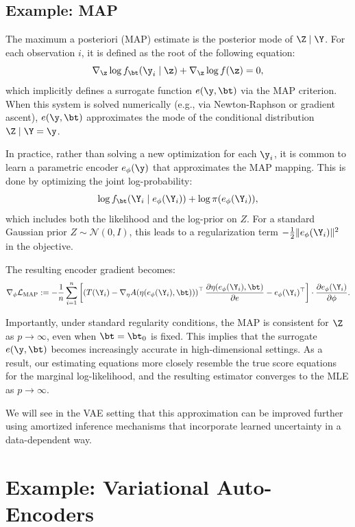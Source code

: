 \subsection{Example: MAP}

The maximum a posteriori (MAP) estimate is the posterior mode of \( \Z \mid \Y \). For each observation \( i \), it is defined as the root of the following equation:
\[
\nabla_{\z} \log f_\bt(\y_i \mid \z) + \nabla_{\z} \log f(\z) = 0,
\]
which implicitly defines a surrogate function \( e(\y, \bt) \) via the MAP criterion. When this system is solved numerically (e.g., via Newton-Raphson or gradient ascent), \( e(\y, \bt) \) approximates the mode of the conditional distribution \( \Z \mid \Y = \y \).

In practice, rather than solving a new optimization for each \( \y_i \), it is common to learn a parametric encoder \( e_\phi(\y) \) that approximates the MAP mapping. This is done by optimizing the joint log-probability:
\[
\log f_\bt(\Y_i \mid e_\phi(\Y_i)) + \log \pi(e_\phi(\Y_i)),
\]
which includes both the likelihood and the log-prior on \( Z \). For a standard Gaussian prior \( Z \sim \mathcal{N}(0, I) \), this leads to a regularization term \( -\frac{1}{2} \|e_\phi(\Y_i)\|^2 \) in the objective.

The resulting encoder gradient becomes:
\[
\nabla_\phi \mathcal{L}_{\text{MAP}} := -\frac{1}{n} \sum_{i=1}^n 
\left[ 
\left( T(\Y_i) - \nabla_\eta A(\eta(e_\phi(\Y_i), \bt)) \right)^\top 
\frac{\partial \eta(e_\phi(\Y_i), \bt)}{\partial e}
- e_\phi(\Y_i)^\top
\right] 
\cdot \frac{\partial e_\phi(\Y_i)}{\partial \phi}.
\]

Importantly, under standard regularity conditions, the MAP is consistent for \( \Z \) as \( p \to \infty \), even when \( \bt = \bt_0 \) is fixed. This implies that the surrogate \( e(\y, \bt) \) becomes increasingly accurate in high-dimensional settings. As a result, our estimating equations more closely resemble the true score equations for the marginal log-likelihood, and the resulting estimator converges to the MLE as \(p \to \infty \).

We will see in the VAE setting that this approximation can be improved further using amortized inference mechanisms that incorporate learned uncertainty in a data-dependent way.


\section{Example: Variational Auto-Encoders}

